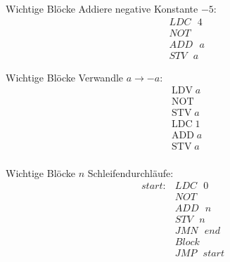 \begin{frame}{Wichtige Blöcke}
  Addiere negative Konstante $-5$:
  \begin{align*}
    &LDC\text{ }4\\
    &NOT\\
    &ADD\text{ }a\\
    &STV\text{ }a
  \end{align*}
\end{frame}

\begin{frame}{Wichtige Blöcke}
  Verwandle $a \rightarrow -a$:
  \begin{align*}
    &\text{LDV}\; a\\
    &\text{NOT}\; \\
    &\text{STV}\; a\\
    &\text{LDC}\; 1\\
    &\text{ADD}\; a\\
    &\text{STV}\; a\\
  \end{align*}
\end{frame}

\begin{frame}{Wichtige Blöcke}
  $n$ Schleifendurchläufe:
  \begin{align*}
    start: &LDC\text{ }0\\
    &NOT\\
    &ADD\text{ }n\\
    &STV\text{ }n\\
    &JMN\text{ }end\\
    &Block\\
    &JMP\text{ }start
  \end{align*}
\end{frame}

